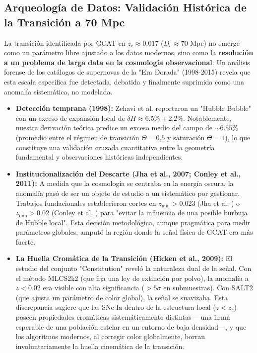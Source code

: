 \documentclass[12pt, a4paper]{article}
\theoremstyle{plain}
\theoremstyle{definition}
\begin{document}
\subsection{Arqueología de Datos: Validación Histórica de la Transición a 70 Mpc}
\label{subsec:arqueologia}

La transición identificada por GCAT en $z_c \approx 0.017$ ($D_c \approx 70$ Mpc) no emerge como un parámetro libre ajustado a los datos modernos, sino como la \textbf{resolución a un problema de larga data en la cosmología observacional}. Un análisis forense de los catálogos de supernovas de la "Era Dorada" (1998-2015) revela que esta escala específica fue detectada, debatida y finalmente suprimida como una anomalía sistemática, no modelada.

\begin{itemize}
    \item \textbf{Detección temprana (1998):} Zehavi et al. \cite{Zehavi1998} reportaron un "Hubble Bubble" con un exceso de expansión local de $\delta H \approx 6.5\% \pm 2.2\%$. Notablemente, nuestra derivación teórica predice un exceso medio del campo de $\sim 6.55\%$ (promedio entre el régimen de transición $\Theta=0.5$ y saturación $\Theta=1$), lo que constituye una validación cruzada cuantitativa entre la geometría fundamental y observaciones históricas independientes.
    
    \item \textbf{Institucionalización del Descarte (Jha et al., 2007; Conley et al., 2011):} A medida que la cosmología se centraba en la energía oscura, la anomalía pasó de ser un objeto de estudio a un sistemático por gestionar. Trabajos fundacionales establecieron cortes en $z_{\text{min}} > 0.023$ (Jha et al. \cite{Jha2007}) o $z_{\text{min}} > 0.02$ (Conley et al. \cite{Conley2011}) para "evitar la influencia de una posible burbuja de Hubble local". Esta decisión metodológica, aunque pragmática para medir parámetros globales, amputó la región donde la señal física de GCAT era más fuerte.
    
    \item \textbf{La Huella Cromática de la Transición (Hicken et al., 2009):} El estudio del conjunto "Constitution" \cite{Hicken2009} reveló la naturaleza dual de la señal. Con el método MLCS2k2 (que fija una ley de extinción por polvo), la anomalía a $z < 0.02$ era visible con alta significancia ($>5\sigma$ en submuestras). Con SALT2 (que ajusta un parámetro de color global), la señal se suavizaba. Esta discrepancia sugiere que las SNe Ia dentro de la estructura local ($z < z_c$) poseen propiedades cromáticas sistemáticamente distintas —una firma esperable de una población estelar en un entorno de baja densidad—, y que los algoritmos modernos, al corregir color globalmente, borran involuntariamente la huella cinemática de la transición.
\end{itemize}
\end{document}

